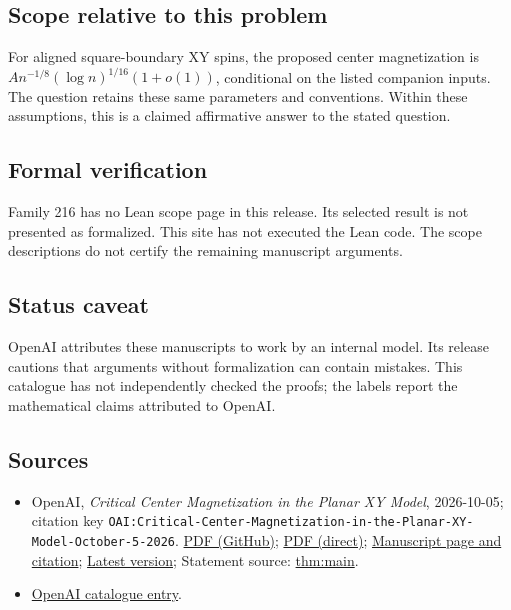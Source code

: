 \documentclass[11pt]{article}
\begin{document}
\subsection{Scope relative to this problem}
For aligned square-boundary XY spins, the proposed center magnetization is $A n^{-1/8}(\log n)^{1/16}(1+o(1))$, conditional on the listed companion inputs. The question retains these same parameters and conventions. Within these assumptions, this is a claimed affirmative answer to the stated question.

\subsection{Formal verification}
Family 216 has no Lean scope page in this release. Its selected result is not presented as formalized. This site has not executed the Lean code. The scope descriptions do not certify the remaining manuscript arguments.

\subsection{Status caveat}
OpenAI attributes these manuscripts to work by an internal model. Its release cautions that arguments without formalization can contain mistakes. This catalogue has not independently checked the proofs; the labels report the mathematical claims attributed to OpenAI.

\subsection{Sources}
\begin{itemize}
\item OpenAI, \emph{Critical Center Magnetization in the Planar XY Model}, 2026-10-05; citation key \texttt{OAI:Critical-Center-Magnetization-in-the-Planar-XY-Model-October-5-2026}. \href{https://github.com/openai/math/blob/adc7f1241b42e322a6451854ab7e4b4c146bf78a/preprints/Critical-Center-Magnetization-in-the-Planar-XY-Model-October-5-2026/paper.pdf}{PDF (GitHub)}; \href{https://github.com/openai/math/raw/adc7f1241b42e322a6451854ab7e4b4c146bf78a/preprints/Critical-Center-Magnetization-in-the-Planar-XY-Model-October-5-2026/paper.pdf}{PDF (direct)}; \href{https://github.com/openai/math/blob/adc7f1241b42e322a6451854ab7e4b4c146bf78a/preprints/Critical-Center-Magnetization-in-the-Planar-XY-Model-October-5-2026/README.md}{Manuscript page and citation}; \href{https://github.com/openai/math/blob/main/preprints/Critical-Center-Magnetization-in-the-Planar-XY-Model-October-5-2026/paper.pdf}{Latest version}; Statement source: \href{https://github.com/openai/math/blob/adc7f1241b42e322a6451854ab7e4b4c146bf78a/preprints/Critical-Center-Magnetization-in-the-Planar-XY-Model-October-5-2026/build/sections/introduction.tex\#L34}{thm:main}.
\item \href{https://github.com/openai/math/blob/adc7f1241b42e322a6451854ab7e4b4c146bf78a/CONTENTS.md}{OpenAI catalogue entry}.
\end{itemize}
\end{document}
